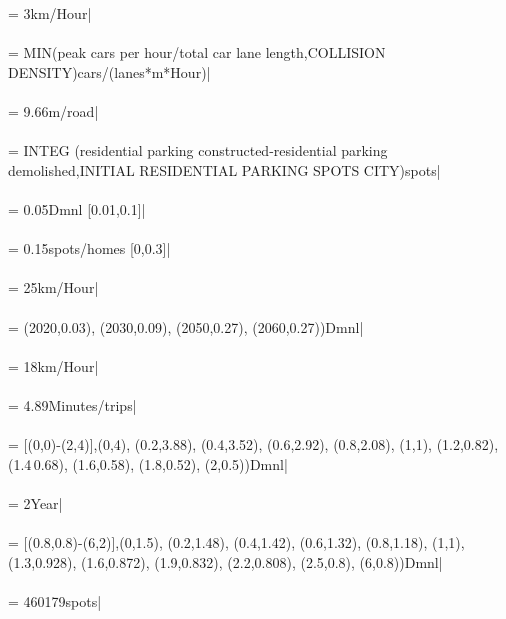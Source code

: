  = {\small 3km/Hour|} \\ \\ 
 = {\small MIN(peak cars per hour/total car lane length,COLLISION DENSITY)cars/(lanes*m*Hour)|} \\ \\ 
 = {\small 9.66m/road|} \\ \\ 
 = {\small  INTEG (residential parking constructed-residential parking demolished,INITIAL RESIDENTIAL PARKING SPOTS CITY)spots|} \\ \\ 
 = {\small 0.05Dmnl [0.01,0.1]|} \\ \\ 
 = {\small 0.15spots/homes [0,0.3]|} \\ \\ 
 = {\small 25km/Hour|} \\ \\ 
 = {\small (2020,0.03), (2030,0.09), (2050,0.27), (2060,0.27))Dmnl|} \\ \\ 
 = {\small 18km/Hour|} \\ \\ 
 = {\small 4.89Minutes/trips|} \\ \\ 
 = {\small [(0,0)-(2,4)],(0,4), (0.2,3.88), (0.4,3.52), (0.6,2.92), (0.8,2.08), (1,1), (1.2,0.82), (1.4\,0.68), (1.6,0.58), (1.8,0.52), (2,0.5))Dmnl|} \\ \\ 
 = {\small 2Year|} \\ \\ 
 = {\small [(0.8,0.8)-(6,2)],(0,1.5), (0.2,1.48), (0.4,1.42), (0.6,1.32), (0.8,1.18), (1,1), (1.3,0.928), (1.6,0.872), (1.9,0.832), (2.2,0.808), (2.5,0.8), (6,0.8))Dmnl|} \\ \\ 
 = {\small 460179spots|} \\ \\ 
